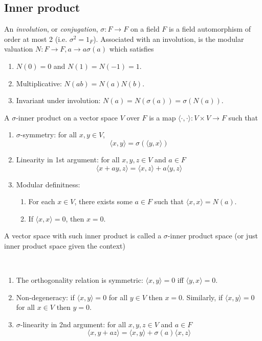 \documentclass{treatise}
\begin{document}
\begin{shaded}
\subsection{Inner product}
An \emph{involution}, or \emph{conjugation}, $\sigma: F \to F$ on a field $F$ is a field automorphism of order at most 2 (i.e. $\sigma^2 = 1_F$). Associated with an involution, is the modular valuation $N: F \to F, a \to a \sigma(a)$ which satisfies
\begin{enumerate}
	\item $N(0) = 0$ and $N(1) = N(-1) = 1$.
	\item Multiplicative: $N(ab) = N(a) N(b)$.
	\item Invariant under involution: $N(a) = N(\sigma(a)) = \sigma(N(a))$.
\end{enumerate}
A $\sigma$-inner product on a vector space $V$ over $F$ is a map $\langle \cdot, \cdot \rangle : V \times V \to F$ such that
\begin{enumerate}
	\item $\sigma$-symmetry: for all $x, y \in V$,
	$$\langle x, y \rangle = \sigma (\langle y, x \rangle)$$
	\item Linearity in 1st argument: for all $x, y, z \in V$ and $a \in F$
	$$\langle x + ay, z \rangle = \langle x, z \rangle + a \langle y, z \rangle$$
	\item Modular definitness:
	\begin{enumerate}
		\item For each $x \in V$, there exists some $a \in F$ such that $\langle x, x \rangle = N(a)$.
		\item If $\langle x, x \rangle = 0$, then $x = 0$.
	\end{enumerate}
\end{enumerate}
A vector space with such inner product is called a $\sigma$-inner product space (or just inner product space given the context)
\begin{proposition} \ 
\begin{enumerate}
	\item The orthogonality relation is symmetric: $\langle x, y \rangle = 0$ iff $\langle y, x \rangle = 0$.
	\item Non-degeneracy: if $\langle x, y \rangle = 0$ for all $y \in V$ then $x = 0$. Similarly, if $\langle x, y \rangle = 0$ for all $x \in V$ then $y = 0$.
	\item $\sigma$-linearity in 2nd argument: for all $x, y, z \in V$ and $a \in F$
	$$\langle x, y + az \rangle = \langle x, y \rangle + \sigma(a) \langle x, z \rangle$$

\end{enumerate}
\end{proposition}
\end{shaded}
\end{document}
